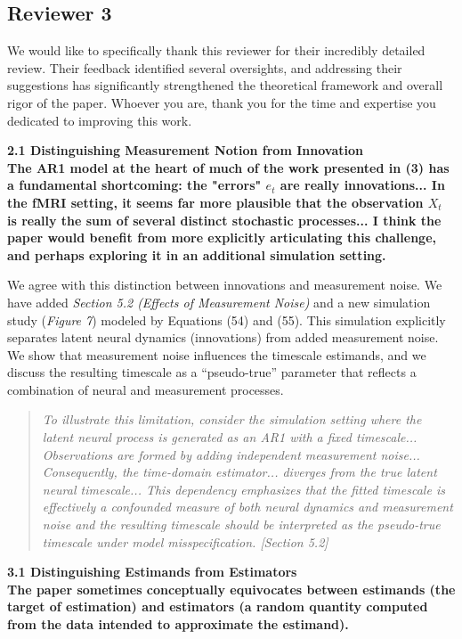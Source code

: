 \documentclass[docs/main.tex]{subfiles}
\newcommand{\reviewercomment}[1]{\vspace{0.3cm}\noindent\textbf{#1}\vspace{0.15cm}}
\newcommand{\manuscriptquote}[1]{\begin{quote}\textit{#1}\end{quote}}
\begin{document}
\subsection*{Reviewer 3}

We would like to specifically thank this reviewer for their incredibly detailed review. Their feedback identified several oversights, and addressing their suggestions has significantly strengthened the theoretical framework and overall rigor of the paper. Whoever you are, thank you for the time and expertise you dedicated to improving this work.

\reviewercomment{2.1 Distinguishing Measurement Notion from Innovation\\
The AR1 model at the heart of much of the work presented in (3) has a fundamental shortcoming: the "errors" $e_t$ are really innovations... In the fMRI setting, it seems far more plausible that the observation $X_t$ is really the sum of several distinct stochastic processes... I think the paper would benefit from more explicitly articulating this challenge, and perhaps exploring it in an additional simulation setting.}

We agree with this distinction between innovations and measurement noise. We have added \textit{Section 5.2 (Effects of Measurement Noise)} and a new simulation study (\textit{Figure 7}) modeled by Equations (54) and (55). This simulation explicitly separates latent neural dynamics (innovations) from added measurement noise. We show that measurement noise influences the timescale estimands, and we discuss the resulting timescale as a ``pseudo-true'' parameter that reflects a combination of neural and measurement processes.

\manuscriptquote{To illustrate this limitation, consider the simulation setting where the latent neural process is generated as an AR1 with a fixed timescale... Observations are formed by adding independent measurement noise... Consequently, the time-domain estimator... diverges from the true latent neural timescale... This dependency emphasizes that the fitted timescale is effectively a confounded measure of both neural dynamics and measurement noise and the resulting timescale should be interpreted as the pseudo-true timescale under model misspecification. [Section 5.2]}

\reviewercomment{3.1 Distinguishing Estimands from Estimators\\
The paper sometimes conceptually equivocates between estimands (the target of estimation) and estimators (a random quantity computed from the data intended to approximate the estimand).}
\end{document}

